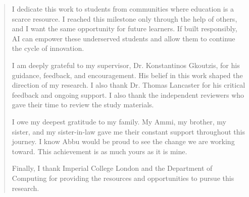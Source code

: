 \renewcommand{\abstractname}{Acknowledgements}
\begin{abstract}

I dedicate this work to students from communities where education is a scarce resource. I reached this milestone only through the help of others, and I want the same opportunity for future learners. If built responsibly, AI can empower these underserved students and allow them to continue the cycle of innovation. 

I am deeply grateful to my supervisor, Dr. Konstantinos Gkoutzis, for his guidance, feedback, and encouragement. His belief in this work shaped the direction of my research. I also thank Dr. Thomas Lancaster for his critical feedback and ongoing support. I also
thank the independent reviewers who gave their time to review the study materials.

I owe my deepest gratitude to my family. My Ammi, my brother, my sister, and my sister-in-law gave me their constant support throughout this journey. I know Abbu would be proud to see the change we are working toward. This achievement is as much yours as it is mine.

Finally, I thank Imperial College London and the Department of Computing for providing the resources and opportunities to pursue this research.

\end{abstract}
